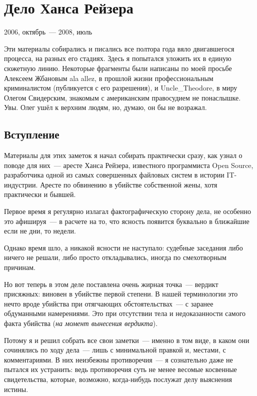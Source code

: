 \section{Дело Ханса Рейзера} 
\begin{timeline}2006, октябрь~--- 2008, июль\end{timeline}

Эти материалы собирались и писались  все полтора года вяло двигавшегося процесса, на разных его стадиях. Здесь я попытался уложить их в единую сюжетную линию. Некоторые фрагменты были написаны по моей просьбе Алексеем Жбановым ala allez, в прошлой жизни профессиональным криминалистом (публикуется с его разрешения), и Uncle\_Theodore, в миру Олегом Свидерским, знакомым с американским правосудием не понаслышке. Увы. Олег ушёл к верхним людям, но, думаю, он бы не возражал.

\subsection{Вступление}

Материалы для этих заметок я начал собирать практически сразу, как узнал о поводе для них~--- аресте Ханса Рейзера, известного программиста Open Source, разработчика одной из самых совершенных файловых систем в истории IT-индустрии. Аресте по обвинению в убийстве собственной жены, хотя практически и бывшей. 

Первое время я регулярно излагал фактографическую сторону дела, не особенно это афишируя~--- в расчете на то, что ясность появится буквально в ближайшие если не дни, то недели. 

Однако время шло, а никакой ясности не наступало: судебные заседания либо ничего не решали, либо просто откладывались, иногда по смехотворным причинам. 

Но вот теперь в этом деле поставлена очень жирная точка~--- вердикт присяжных: виновен в убийстве первой степени. В нашей терминологии это нечто вроде убийства при отягчающих обстоятельствах~--- с заранее обдуманными намерениями. Это при отсутствии тела и недоказанности самого факта убийства (\textit{на момент вынесения вердикта}). 

Потому я и решил собрать все свои заметки~--- именно в том виде, в каком они сочинялись по ходу дела~--- лишь с минимальной правкой и, местами, с комментариями. В них неизбежны противоречия~--- я сознательно даже не пытался их устранить: ведь противоречия суть не менее весомые косвенные свидетельства, которые, возможно, когда-нибудь послужат делу выяснения истины. 

